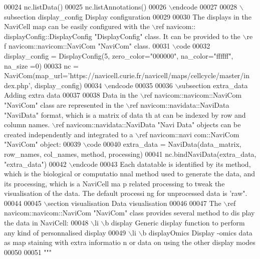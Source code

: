 \begin{DoxyCode}
00024 \textcolor{stringliteral}{nc.listData()}
00025 \textcolor{stringliteral}{nc.listAnnotations()}
00026 \textcolor{stringliteral}{\(\backslash\)endcode}
00027 \textcolor{stringliteral}{}
00028 \textcolor{stringliteral}{\(\backslash\)subsection display\_config Display configuration}
00029 \textcolor{stringliteral}{}
00030 \textcolor{stringliteral}{The displays in the NaviCell map can be easily configured with the \(\backslash\)ref navicom::
      displayConfig::DisplayConfig "DisplayConfig" class. It can be provided to the \(\backslash\)re
      f navicom::navicom::NaviCom "NaviCom" class.}
00031 \textcolor{stringliteral}{\(\backslash\)code}
00032 \textcolor{stringliteral}{display\_config = DisplayConfig(5, zero\_color="000000", na\_color="ffffff", na\_size
      =0)}
00033 \textcolor{stringliteral}{nc = NaviCom(map\_url='https://navicell.curie.fr/navicell/maps/cellcycle/master/in
      dex.php', display\_config)}
00034 \textcolor{stringliteral}{\(\backslash\)endcode}
00035 \textcolor{stringliteral}{}
00036 \textcolor{stringliteral}{\(\backslash\)subsection extra\_data Adding extra data}
00037 \textcolor{stringliteral}{}
00038 \textcolor{stringliteral}{Data in the \(\backslash\)ref navicom::navicom::NaviCom "NaviCom" class are represented in the
       \(\backslash\)ref navicom::navidata::NaviData "NaviData" format, which is a matrix of data th
      at can be indexed by row and column names. \(\backslash\)ref navicom::navidata::NaviData "Navi
      Data" objects can be created independently and integrated to a \(\backslash\)ref navicom::navi
      com::NaviCom "NaviCom" object:}
00039 \textcolor{stringliteral}{\(\backslash\)code}
00040 \textcolor{stringliteral}{extra\_data = NaviData(data\_matrix, row\_names, col\_names, method, processing)}
00041 \textcolor{stringliteral}{nc.bindNaviData(extra\_data, "extra\_data")}
00042 \textcolor{stringliteral}{\(\backslash\)endcode}
00043 \textcolor{stringliteral}{Each datatable is identified by its method, which is the biological or computatio
      nnal method used to generate the data, and its processing, which is a NaviCell ma
      p related processing to tweak the visualisation of the data. The default processi
      ng for unprocessed data is 'raw".}
00044 \textcolor{stringliteral}{}
00045 \textcolor{stringliteral}{\(\backslash\)section visualisation Data visualisation}
00046 \textcolor{stringliteral}{}
00047 \textcolor{stringliteral}{The \(\backslash\)ref navicom::navicom::NaviCom "NaviCom" class provides several method to dis
      play the data in NaviCell:}
00048 \textcolor{stringliteral}{    \(\backslash\)li \(\backslash\)b display Generic display function to perform any kind of personnalised 
      display}
00049 \textcolor{stringliteral}{    \(\backslash\)li \(\backslash\)b displayOmics Display -omics data as map staining with extra informatio
      n or data on using the other display modes}
00050 \textcolor{stringliteral}{}
00051 \textcolor{stringliteral}{"""}
\end{DoxyCode}
